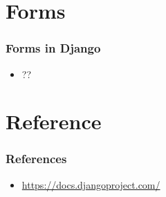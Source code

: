 \documentclass[bigger, presentation]{beamer}
\begin{document}
\section{Forms}
\label{sec-5}
\begin{frame}
\frametitle{Forms in Django}
\label{sec-5-1}

\begin{itemize}
\item ??
\end{itemize}
\end{frame}
\section{Reference}
\label{sec-6}
\begin{frame}
\frametitle{References}
\label{sec-6-1}

\begin{itemize}
\item \href{https://docs.djangoproject.com/}{https://docs.djangoproject.com/}
\end{itemize}
\end{frame}
\end{document}
